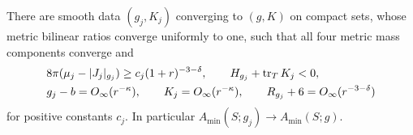 \begin{lemma}\label{lem:ah-preparation}
There are smooth data \((g_j,K_j)\) converging to \((g,K)\) on compact
sets, whose metric bilinear ratios converge uniformly to one, such that
all four metric mass components converge and
\begin{equation}\label{eq:ah-prepared-data}
 \begin{split}
 &8\pi(\mu_j-|J_j|_{g_j})\ge c_j(1+r)^{-3-\delta},
 \qquad H_{g_j}+\operatorname{tr}_TK_j<0,\\
 &g_j-b=O_\infty(r^{-\kappa}),\qquad
 K_j=O_\infty(r^{-\kappa}),\qquad
 R_{g_j}+6=O_\infty(r^{-3-\delta})
 \end{split}
\end{equation}
for positive constants \(c_j\).  In particular
\(A_{\min}(S;g_j)\to A_{\min}(S;g)\).
\end{lemma}

